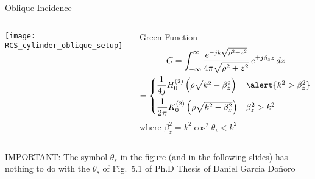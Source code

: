 %
%

  \begin{frame}[allowframebreaks]{Oblique Incidence}

  \begin{columns}
     \centering
    \texttt{[image: RCS\_cylinder\_oblique\_setup]}
    
     \centering
   \begin{block}{Green Function}
       \begin{multline*}
         G = \int_{-\infty}^{\infty} 
        \dfrac{e^{-j k \sqrt{\rho^2+z^2}}}{4\pi \sqrt{\rho^2+z^2}}
        \, e^{\pm j\beta_z z } \, dz \\
        = 
        \begin{cases}
          \dfrac{1}{4j} H_0^{(2)}\left( \rho\sqrt{k^2-\beta_z^2}\right) 
                  & \alert{k^2 > \beta_z^2} \\[2ex]
          \dfrac{1}{2\pi} K_0^{(2)}\left( \rho\sqrt{k^2-\beta_z^2}\right) 
                  & \beta_z^2 > k^2
        \end{cases}
      \end{multline*}
      where $\beta_z^2=k^2\cos^2\theta_i < k^2$


    \end{block}

  \end{columns}

  \vbs
  
  \alert{IMPORTANT: The symbol $\theta_s$ in the figure (and in the
    following slides) has nothing to do with the $\theta_s$ of Fig.\
    5.1 of Ph.D Thesis of Daniel Garcia Doñoro}
  

\end{frame}
